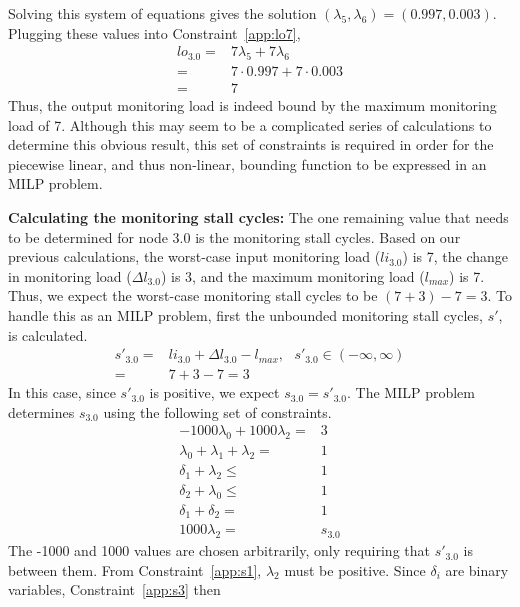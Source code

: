 Solving this system of equations gives the solution $(\lambda_5, \lambda_6) =
(0.997, 0.003)$. Plugging these values into Constraint~\ref{app:lo7},
\begin{align*}
  lo_{3.0} =& 7\lambda_5 + 7\lambda_6 \\
  =& 7\cdot 0.997 + 7\cdot 0.003 \\
  =& 7
\end{align*}
Thus, the output monitoring load is indeed bound by the maximum monitoring load
of 7. Although this may seem to be a complicated series of calculations to
determine this obvious result, this set of constraints is required in order for
the piecewise linear, and thus non-linear, bounding function to be expressed in
an MILP problem.

{\bf Calculating the monitoring stall cycles:} The one remaining value that
needs to be determined for node 3.0 is the monitoring stall cycles. Based on
our previous calculations, the worst-case input monitoring load ($li_{3.0}$) is
7, the change in monitoring load ($\Delta l_{3.0}$) is 3, and the maximum
monitoring load ($l_{max}$) is 7. Thus, we expect the worst-case monitoring
stall cycles to be $(7+3)-7 = 3$. To handle this as an MILP problem, first the
unbounded monitoring stall cycles, $s'$, is calculated.
\begin{align*}
  s'_{3.0} =& li_{3.0} + \Delta l_{3.0} - l_{max}, \text{ } s'_{3.0} \in (-\infty, \infty) \\
  =& 7 + 3 - 7 = 3
\end{align*}
In this case, since $s'_{3.0}$ is positive, we expect $s_{3.0} = s'_{3.0}$. The
MILP problem determines $s_{3.0}$ using the following set of constraints.
\begin{subequations}
\begin{align}
  -1000\lambda_0 + 1000\lambda_2 =& 3 \label{app:s1}\\
  \lambda_0 + \lambda_1 + \lambda_2 =& 1 \label{app:s2}\\
  \delta_1 + \lambda_2 \leq& 1 \label{app:s3}\\
  \delta_2 + \lambda_0 \leq& 1 \label{app:s4}\\
  \delta_1 + \delta_2 =& 1 \label{app:s5}\\
  1000\lambda_2 =& s_{3.0} \label{app:s6}
\end{align}
\end{subequations}
The -1000 and 1000 values are chosen arbitrarily, only requiring that
$s'_{3.0}$ is between them. From Constraint~\ref{app:s1}, $\lambda_2$ must be
positive. Since $\delta_i$ are binary variables, Constraint~\ref{app:s3} then
